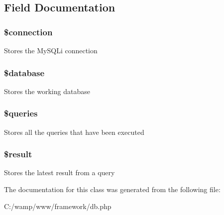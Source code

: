 \subsection{Field Documentation}
\hypertarget{class_my_s_q_li_database_a0d9c79b9b86b3f5891c6d3892f12c6a0}{
\subsubsection[{\$connection}]{\setlength{\rightskip}{0pt plus 5cm}\$connection}}
\label{class_my_s_q_li_database_a0d9c79b9b86b3f5891c6d3892f12c6a0}
Stores the MySQLi connection \hypertarget{class_my_s_q_li_database_a7691c0162d89de0b6ba47edcd8ba8878}{
\subsubsection[{\$database}]{\setlength{\rightskip}{0pt plus 5cm}\$database}}
\label{class_my_s_q_li_database_a7691c0162d89de0b6ba47edcd8ba8878}
Stores the working database \hypertarget{class_my_s_q_li_database_a576b05de2f452e4cce4e3de12667ba0f}{
\subsubsection[{\$queries}]{\setlength{\rightskip}{0pt plus 5cm}\$queries}}
\label{class_my_s_q_li_database_a576b05de2f452e4cce4e3de12667ba0f}
Stores all the queries that have been executed \hypertarget{class_my_s_q_li_database_a112ef069ddc0454086e3d1e6d8d55d07}{
\subsubsection[{\$result}]{\setlength{\rightskip}{0pt plus 5cm}\$result}}
\label{class_my_s_q_li_database_a112ef069ddc0454086e3d1e6d8d55d07}
Stores the latest result from a query 

The documentation for this class was generated from the following file:\begin{DoxyCompactItemize}
\item 
C:/wamp/www/framework/db.php\end{DoxyCompactItemize}
